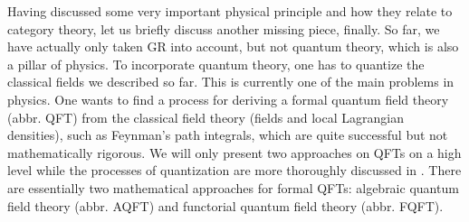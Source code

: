 Having discussed some very important physical principle and how they relate to category theory, let us briefly discuss another missing piece, finally.
So far, we have actually only taken GR into account, but not quantum theory, which is also a pillar of physics.
To incorporate quantum theory, one has to quantize the classical fields we described so far.
This is currently one of the main problems in physics.
One wants to find a process for deriving a formal quantum field theory (abbr. QFT) from the classical field theory (fields and local Lagrangian densities), such as Feynman's path integrals, which are quite successful but not mathematically rigorous.
We will only present two approaches on QFTs on a high level while the processes of quantization are more thoroughly discussed in \cite{00000011}.
There are essentially two mathematical approaches for formal QFTs: algebraic quantum field theory (abbr. AQFT) and functorial quantum field theory (abbr. FQFT).

